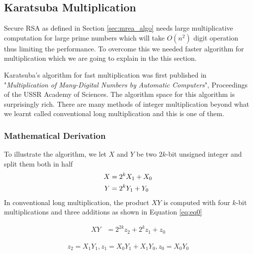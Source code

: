 \documentclass[12pt,journal,compsoc]{IEEEtran}
\begin{document}

\subsection{{Karatsuba Multiplication}}
\label{sec: karatsuba_code}

Secure RSA as defined in Section \ref{sec:mrea_algo} needs large multiplicative computation for large prime numbers which will take $O(n^2)$ digit operation thus limiting the performance. To overcome this we needed faster algorithm for multiplication which we are going to explain in the this section.


Karatsuba's algorithm for fast multiplication was first published in "\emph{Multiplication of Many-Digital Numbers by Automatic Computers}"\cite{karatsuba}, Proceedings of the USSR Academy of Sciences. The algorithm space for this algorithm is surprisingly rich. There are many methods of integer multiplication beyond what we learnt called conventional long multiplication and this is one of them. 

\subsubsection{\bf Mathematical Derivation}

To illustrate the algorithm, we let $X$ and $Y$ be two $2k$-bit unsigned integer and split them both in half
\begin{align}
X &= 2^{k}X_{1} + X_{0} \notag \\
Y &= 2^{k}Y_{1} + Y_{0} 
\end{align}
In conventional long multiplication, the product $XY$ is computed with four $k$-bit multiplications and three additions as shown in Equation \ref{eq:eq0}

\begin{align}
\label{eq:eq0}
XY &= 2^{2k}z_{2} + 2^{k}z_{1} + z_{0}
\end{align}

\begin{align}
\label{eq:eq1}
z_2 = X_{1}Y_{1}, z_{1} = X_{0}Y_{1} + X_{1}Y_{0}, z_{0} = X_{0}Y_{0}
\end{align}
\end{document}
